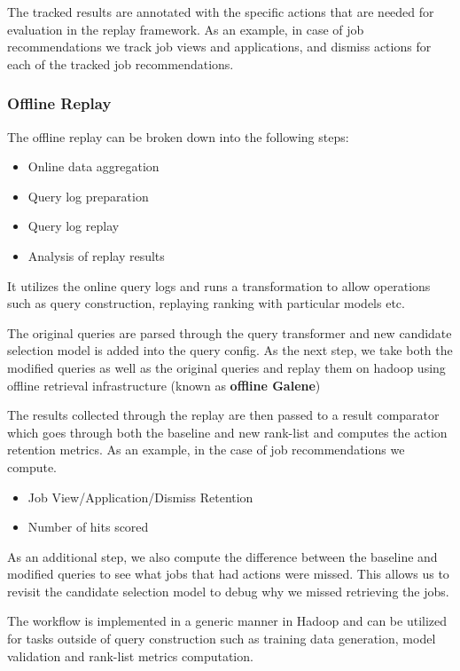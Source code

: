 The tracked results are annotated with the specific actions that are needed 
for evaluation in the replay framework. As an example, in case of job 
recommendations we track job views and applications, and dismiss actions 
for each of the tracked job recommendations. 

\subsubsection{Offline Replay}
The offline replay can be broken down into the following steps: 
\begin{itemize}
\item Online data aggregation
\item Query log preparation
\item Query log replay
\item Analysis of replay results 
\end{itemize}

It utilizes the online query logs and runs a transformation to allow operations such as
query construction, replaying ranking with particular models etc.

The original queries are parsed through the query transformer and 
new candidate selection model is added into the query config. 
As the next step, we take both the modified queries as well as the original 
queries and replay them on hadoop using offline retrieval infrastructure (known
as {\bf offline Galene})

The results collected through the replay are then passed to a result 
comparator which goes through both the baseline and new rank-list and 
computes the action retention metrics. As an example, in the case of job 
recommendations we compute. 
\begin{itemize}
\item Job View/Application/Dismiss Retention
\item Number of hits scored
\end{itemize}

As an additional step, we also compute the difference between the baseline and 
modified queries to see what jobs that had actions were missed. 
This allows us to revisit the candidate selection model to debug why we 
missed retrieving the jobs. 

The workflow is implemented in a generic manner 
in Hadoop and can be utilized for tasks outside of query construction such 
as training data generation, model validation and rank-list metrics computation. 
